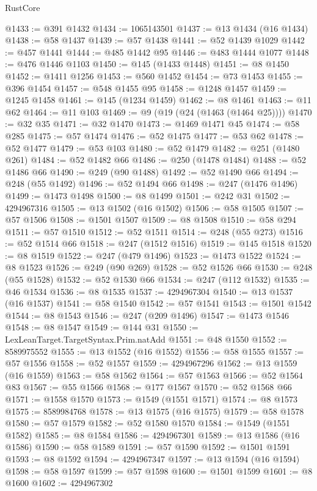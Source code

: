 \begin{lexlean}{RustCore}
\begin{coremodule}
@1433 := @391 @1432
@1434 := 1065143501
@1437 := @13 @1434 (@16 @1434)
@1438 := @58 @1437
@1439 := @57 @1438
@1441 := @52 @1439 @1029
@1442 := @457 @1441
@1444 := @485 @1442 @95
@1446 := @483 @1444 @1077
@1448 := @476 @1446 @1103
@1450 := @145 (@1433 @1448)
@1451 := @8 @1450
@1452 := @1411 @1256
@1453 := @560 @1452
@1454 := @73 @1453
@1455 := @396 @1454
@1457 := @548 @1455 @95
@1458 := @1248 @1457
@1459 := @1245 @1458
@1461 := @145 (@1234 @1459)
@1462 := @8 @1461
@1463 := @11 @62
@1464 := @11 @103
@1469 := @9 (@19 (@24 (@1463 (@1464 @25))))
@1470 := @32 @35
@1471 := @32 @1470
@1473 := @1469 @1471 @45
@1474 := @58 @285
@1475 := @57 @1474
@1476 := @52 @1475
@1477 := @53 @62
@1478 := @52 @1477
@1479 := @53 @103
@1480 := @52 @1479
@1482 := @251 (@1480 @261)
@1484 := @52 @1482 @66
@1486 := @250 (@1478 @1484)
@1488 := @52 @1486 @66
@1490 := @249 (@90 @1488)
@1492 := @52 @1490 @66
@1494 := @248 (@55 @1492)
@1496 := @52 @1494 @66
@1498 := @247 (@1476 @1496)
@1499 := @1473 @1498
@1500 := @8 @1499
@1501 := @242 @31
@1502 := 4294967316
@1505 := @13 @1502 (@16 @1502)
@1506 := @58 @1505
@1507 := @57 @1506
@1508 := @1501 @1507
@1509 := @8 @1508
@1510 := @58 @294
@1511 := @57 @1510
@1512 := @52 @1511
@1514 := @248 (@55 @273)
@1516 := @52 @1514 @66
@1518 := @247 (@1512 @1516)
@1519 := @145 @1518
@1520 := @8 @1519
@1522 := @247 (@479 @1496)
@1523 := @1473 @1522
@1524 := @8 @1523
@1526 := @249 (@90 @269)
@1528 := @52 @1526 @66
@1530 := @248 (@55 @1528)
@1532 := @52 @1530 @66
@1534 := @247 (@112 @1532)
@1535 := @46 @1534
@1536 := @8 @1535
@1537 := 4294967304
@1540 := @13 @1537 (@16 @1537)
@1541 := @58 @1540
@1542 := @57 @1541
@1543 := @1501 @1542
@1544 := @8 @1543
@1546 := @247 (@209 @1496)
@1547 := @1473 @1546
@1548 := @8 @1547
@1549 := @144 @31
@1550 := LexLeanTarget.TargetSyntax.Prim.natAdd
@1551 := @48 @1550
@1552 := 8589975552
@1555 := @13 @1552 (@16 @1552)
@1556 := @58 @1555
@1557 := @57 @1556
@1558 := @52 @1557
@1559 := 4294967296
@1562 := @13 @1559 (@16 @1559)
@1563 := @58 @1562
@1564 := @57 @1563
@1566 := @52 @1564 @83
@1567 := @55 @1566
@1568 := @177 @1567
@1570 := @52 @1568 @66
@1571 := @1558 @1570
@1573 := @1549 (@1551 @1571)
@1574 := @8 @1573
@1575 := 8589984768
@1578 := @13 @1575 (@16 @1575)
@1579 := @58 @1578
@1580 := @57 @1579
@1582 := @52 @1580 @1570
@1584 := @1549 (@1551 @1582)
@1585 := @8 @1584
@1586 := 4294967301
@1589 := @13 @1586 (@16 @1586)
@1590 := @58 @1589
@1591 := @57 @1590
@1592 := @1501 @1591
@1593 := @8 @1592
@1594 := 4294967347
@1597 := @13 @1594 (@16 @1594)
@1598 := @58 @1597
@1599 := @57 @1598
@1600 := @1501 @1599
@1601 := @8 @1600
@1602 := 4294967302

\end{coremodule}
\end{lexlean}
